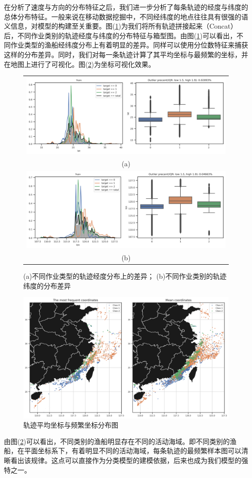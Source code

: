 \documentclass[UTF8, 12pt]{ctexart}
\begin{document}
	在分析了速度与方向的分布特征之后，我们进一步分析了每条轨迹的经度与纬度的总体分布特征。一般来说在移动数据挖掘中，不同经纬度的地点往往具有很强的语义信息，对模型的构建至关重要。图(\ref{sec_1_fig_6})为我们将所有轨迹拼接起来（Concat）后，不同作业类别的轨迹经度与纬度的分布特征与箱型图。由图(\ref{sec_1_fig_6})可以看出，不同作业类型的渔船经纬度分布上有着明显的差异。同样可以使用分位数特征来捕获这样的分布差异。同时，我们对每一条轨迹计算了其平均坐标与最频繁的坐标，并在地图上进行了可视化。图(\ref{sec_1_fig_7})为坐标可视化效果。
	\begin{figure}[H]
		\centering
		\begin{tabular}{c}
			\includegraphics[width=0.75\linewidth]{..//plots//feature_lat_distribution.png} \\
			(a) \\
			\includegraphics[width=0.75\linewidth]{..//plots//feature_lon_distribution.png} \\
			(b)
		\end{tabular}
		\caption{(a)不同作业类型的轨迹经度分布上的差异； (b)不同作业类别的轨迹纬度的分布差异}
		\label{sec_1_fig_6}
		\vspace{-0.2cm}
	\end{figure}

	\begin{figure}[H]
		\centering
		\includegraphics[width=0.75\linewidth]{..//plots//feature_mean_freq_coordinates.png}
		\caption{轨迹平均坐标与频繁坐标分布图}
		\label{sec_1_fig_7}
		\vspace{-0.2cm}
	\end{figure}
	由图(\ref{sec_1_fig_7})可以看出，不同类别的渔船明显存在不同的活动海域。即不同类别的渔船，在平面坐标系下，有着明显不同的活动海域，每条轨迹的最频繁样本图可以清晰看出该规律。这点可以直接作为分类模型的建模依据，后来也成为我们模型的强特之一。
\end{document}
